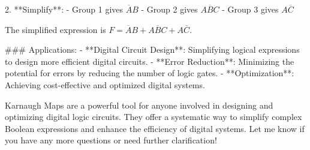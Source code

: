2. **Simplify**:
   - Group 1 gives \( \overline{A}B \)
   - Group 2 gives \( A\overline{B}C \)
   - Group 3 gives \( A\overline{C} \)

The simplified expression is \( F = \overline{A}B + A\overline{B}C + A\overline{C} \).

### Applications:
- **Digital Circuit Design**: Simplifying logical expressions to design more efficient digital circuits.
- **Error Reduction**: Minimizing the potential for errors by reducing the number of logic gates.
- **Optimization**: Achieving cost-effective and optimized digital systems.

Karnaugh Maps are a powerful tool for anyone involved in designing and optimizing digital logic circuits. 
They offer a systematic way to simplify complex Boolean expressions and enhance the efficiency of digital systems. Let me know if you have any more questions or need further clarification!